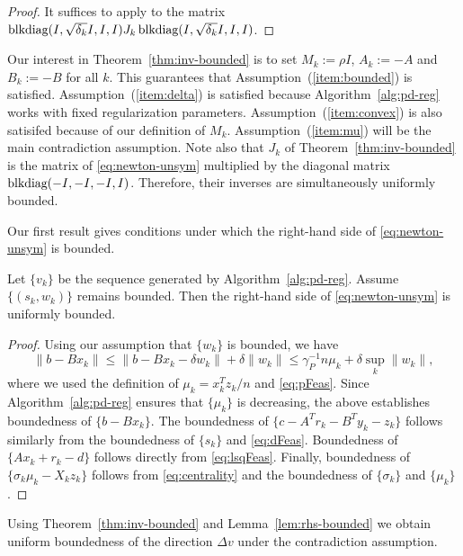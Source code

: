 \documentclass{amsart}
\begin{document}
\begin{proof}
  It suffices to apply \cite[Theorem~$1$]{armand-benoist-2011} to the matrix
  $\mathop{\text{blkdiag}}(I, \sqrt{\delta_k} I, I, I) J_k \mathop{\text{blkdiag}}(I, \sqrt{\delta_k} I, I,
  I)$.
\end{proof}

Our interest in Theorem~\ref{thm:inv-bounded} is to set $M_k := \rho I$, $A_k :=
-A$ and $B_k := -B$ for all $k$. This guarantees that
Assumption~(\ref{item:bounded}) is satisfied. Assumption~(\ref{item:delta}) is
satisfied because Algorithm~\ref{alg:pd-reg} works with fixed regularization
parameters. Assumption~(\ref{item:convex}) is also satisifed because of our
definition of $M_k$. Assumption~(\ref{item:mu}) will be the main contradiction
assumption. Note also that  $J_k$ of Theorem~\ref{thm:inv-bounded} is
the  matrix of \eqref{eq:newton-unsym} multiplied by the diagonal
matrix $\mathop{\text{blkdiag}}(-I, -I, -I, I)$. Therefore, their inverses are simultaneously
uniformly bounded.

Our first result gives conditions under which the right-hand side
of \eqref{eq:newton-unsym} is bounded.

\begin{blemma}
  \label{lem:rhs-bounded}
  Let $\{v_k\}$ be the sequence generated by Algorithm~\ref{alg:pd-reg}. Assume
  $\{(s_k, w_k)\}$ remains bounded. Then the right-hand side of
  \eqref{eq:newton-unsym} is uniformly bounded.
\end{blemma}

\begin{proof}
  Using our assumption that $\{w_k\}$ is bounded, we have
  \[
    \|b - B x_k\| \leq
    \|b - Bx_k - \delta w_k\| + \delta \|w_k\| \leq
    \gamma_P^{-1} n \mu_k + \delta \sup_k \|w_k\|,
  \]
  where we used the definition of $\mu_k = x_k^T z_k / n$ and \eqref{eq:pFeas}.
  Since Algorithm~\ref{alg:pd-reg} ensures that $\{\mu_k\}$ is decreasing, the
  above establishes boundedness of $\{b - B x_k\}$. The boundedness of $\{c -
  A^T r_k - B^T y_k - z_k\}$ follows similarly from the boundedness of
  $\{s_k\}$ and \eqref{eq:dFeas}. Boundedness of $\{A x_k + r_k - d\}$ follows
  directly from \eqref{eq:lsqFeas}. Finally, boundedness of $\{\sigma_k \mu_k -
  X_k z_k\}$ follows from \eqref{eq:centrality} and the boundedness of
  $\{\sigma_k\}$ and $\{\mu_k\}$.
\end{proof}

Using Theorem~\ref{thm:inv-bounded} and Lemma~\ref{lem:rhs-bounded}
we obtain uniform boundedness of the direction $\Delta v$ under the
contradiction assumption.
\end{document}
